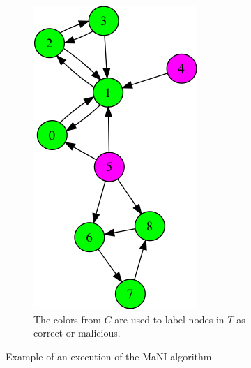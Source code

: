 \begin{figure}
\begin{subfigure}{0.25\textwidth}
\includegraphics[width=\linewidth]{images/mani/4-result.png}
\caption{The colors from $C$ are used to label nodes in $T$ as correct or malicious.} \label{fig:mani4}
\end{subfigure}


\caption{Example of an execution of the MaNI algorithm.}\label{fig:mani}
\end{figure}



